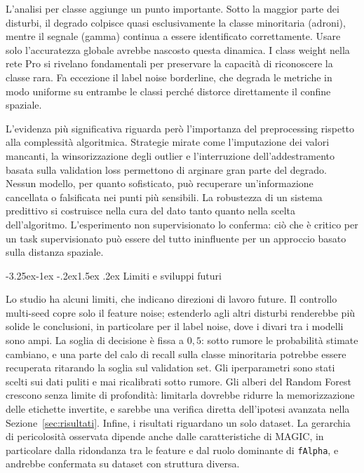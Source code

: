 \documentclass[12pt,a4paper]{article}
\makeatletter
\renewcommand\subsection{\@startsection{subsection}{2}{\z@}%
  {-3.25ex\@plus -1ex \@minus -.2ex}{1.5ex \@plus .2ex}%
  {\normalfont\large\bfseries}}
\makeatother
\begin{document}
L'analisi per classe aggiunge un punto importante. Sotto la maggior
parte dei disturbi, il degrado colpisce quasi esclusivamente la classe
minoritaria (adroni), mentre il segnale (gamma) continua a essere identificato
correttamente. Usare solo l'accuratezza globale avrebbe nascosto questa
dinamica. I class weight nella rete Pro si rivelano fondamentali per preservare
la capacità di riconoscere la classe rara. Fa eccezione il label noise
borderline, che degrada le metriche in modo uniforme su entrambe le classi
perché distorce direttamente il confine spaziale.

L'evidenza più significativa riguarda però l'importanza del preprocessing
rispetto alla complessità algoritmica. Strategie mirate come l'imputazione dei
valori mancanti, la winsorizzazione degli outlier e l'interruzione
dell'addestramento basata sulla validation loss permettono di arginare gran
parte del degrado. Nessun modello, per quanto sofisticato, può recuperare
un'informazione cancellata o falsificata nei punti più sensibili. La robustezza
di un sistema predittivo si costruisce nella cura del dato tanto quanto nella
scelta dell'algoritmo. L'esperimento non supervisionato lo
conferma: ciò che è critico per un task supervisionato può essere del tutto
ininfluente per un approccio basato sulla distanza spaziale.

\subsection{Limiti e sviluppi futuri}

Lo studio ha alcuni limiti, che indicano direzioni di lavoro future. Il
controllo multi-seed copre solo il feature noise; estenderlo agli altri
disturbi renderebbe più solide le conclusioni, in particolare per il label
noise, dove i divari tra i modelli sono ampi. La soglia di decisione è fissa a
$0{,}5$: sotto rumore le probabilità stimate cambiano, e una parte del calo di
recall sulla classe minoritaria potrebbe essere recuperata ritarando la soglia
sul validation set. Gli iperparametri sono stati scelti sui dati puliti e mai
ricalibrati sotto rumore. Gli alberi del Random Forest crescono senza limite di
profondità: limitarla dovrebbe ridurre la memorizzazione delle etichette
invertite, e sarebbe una verifica diretta dell'ipotesi avanzata nella
Sezione~\ref{sec:risultati}. Infine, i risultati riguardano un solo dataset. La
gerarchia di pericolosità osservata dipende anche dalle caratteristiche di
MAGIC, in particolare dalla ridondanza tra le feature e dal ruolo dominante di
\texttt{fAlpha}, e andrebbe confermata su dataset con struttura diversa.
\end{document}
